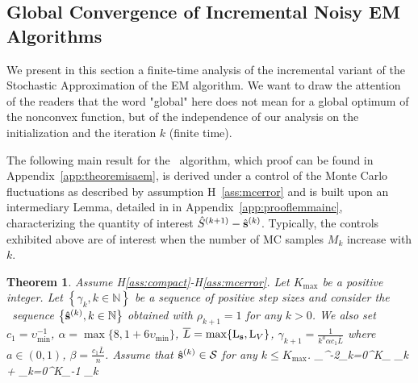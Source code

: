 \documentclass[11pt]{article}
\newtheorem{Lemma}{Lemma}
\newtheorem{Theorem}{Theorem}
\theoremstyle{t}
\begin{document}
\subsection{Global Convergence of Incremental Noisy EM Algorithms}
We present in this section a finite-time analysis of the incremental variant of the Stochastic Approximation of the EM algorithm. We want to draw the attention of the readers that the word "global" here does not mean for a global optimum of the nonconvex function, but of the independence of our analysis on the initialization and the iteration $k$ (finite time).

The following main result for the \ISAEM\ algorithm, which proof can be found in Appendix~\ref{app:theoremisaem}, is derived under a control of the Monte Carlo fluctuations as described by assumption H~\ref{ass:mcerror} and is built upon an intermediary Lemma, detailed in in Appendix~\ref{app:prooflemmainc}, characterizing the quantity of interest $\hat{S}^{(k+1)} - \hat{{\mathbf{s}}}^{(k)}$.
Typically, the controls exhibited above are of interest when the number of MC samples $M_k$ increase with $k$.

\begin{Theorem}\label{thm:isaem}
Assume H\ref{ass:compact}-H\ref{ass:mcerror}.
Let $K_{\max }$ be a positive integer. 
Let $\left\{\gamma_{k}, k \in \mathbb{N}\right\}$ be a sequence of positive step sizes and consider the \ISAEM\ sequence $\left\{\hat{{\mathbf{s}}}^{(k)}, k \in \mathbb{N}\right\}$ obtained with $\rho_{k+1}=1$ for any $k>0$. We also set $c_1 = \upsilon_{\min}^{-1}$, $\alpha = \max\{8, 1+6\upsilon_{\min}\}$, $\overline{L} = \max\{ \operatorname{L}_{{\mathbf{s}}} , \operatorname{L}_{V} \}$, $\gamma_{k+1} = \frac{1}{k^a \alpha c_1 \overline{L}}$ where $a \in (0,1)$, $\beta = \frac{c_1 \overline{L}}{n}$. 
Assume that $ \hat{{\mathbf{s}}}^{(k)} \in \mathcal{S}$ for any $k \leq K_{\max }$.
\beq
\upsilon_{\max}^{-2}\sum_{k=0}^{K_{\max}} \tilde{\alpha}_k \EE {}  \leq   \EE \left[ V( \hs{0} ) - V( \hs{K} ) \right]+ \sum_{k=0}^{K_{\max}-1} \tilde{\Gamma}_k         \EE {} 
\eeq
\end{Theorem} 
\end{document}
